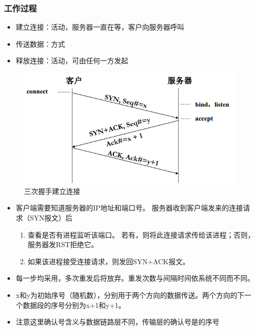 \subsubsection{工作过程}
\begin{center}
\end{center}
\begin{itemize}
    \item 建立连接：活动，服务器一直在等，客户向服务器呼叫
    \item 传送数据：方式
    \item 释放连接：活动，可由任何一方发起
\end{itemize}

\myhline
\begin{figure}[H]
    \centering
    \includegraphics[width=0.6\linewidth]{fig/tcp_connect.png}
    \caption*{三次握手建立连接}
\end{figure}
\begin{itemize}
    \item 客户端需要知道服务器的IP地址和端口号。
    服务器收到客户端发来的连接请求（SYN报文）后
    \begin{enumerate}
        \item 查看是否有进程监听该端口。
        若有，则将此连接请求传给该进程；否则，服务器发RST拒绝它。
        \item 如果该进程接受连接请求，则发回SYN+ACK报文。
    \end{enumerate}
    \item 每一步均采用，多次重发后将放弃。重发次数与间隔时间依系统不同而不同。
    \item x和y为初始序号（随机数），分别用于两个方向的数据传送。两个方向的下一个数据段的序号分别为x+1和y+1。
    \item 注意这里确认号含义与数据链路层不同，传输层的确认号是\textcolor{red}{}的序号
\end{itemize}

